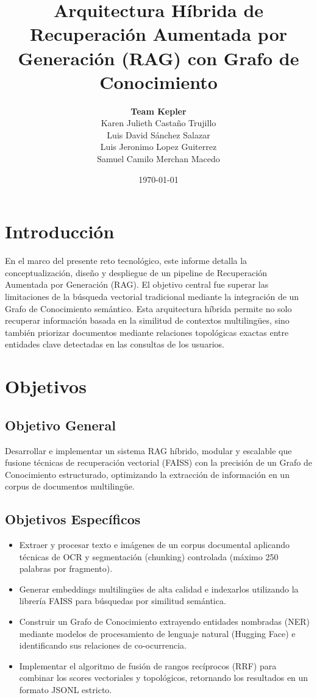 \documentclass[12pt,a4paper]{article}
\title{\textbf{Arquitectura Híbrida de Recuperación Aumentada por Generación (RAG) con Grafo de Conocimiento}}
\author{
    \textbf{Team Kepler} \\
    Karen Julieth Castaño Trujillo \\
    Luis David Sánchez Salazar \\
    Luis Jeronimo Lopez Guiterrez \\
    Samuel Camilo Merchan Macedo
}
\date{\today}
\begin{document}
\maketitle

\tableofcontents
\newpage

\section{Introducción}
En el marco del presente reto tecnológico, este informe detalla la conceptualización, diseño y despliegue de un pipeline de Recuperación Aumentada por Generación (RAG). El objetivo central fue superar las limitaciones de la búsqueda vectorial tradicional mediante la integración de un Grafo de Conocimiento semántico. Esta arquitectura híbrida permite no solo recuperar información basada en la similitud de contextos multilingües, sino también priorizar documentos mediante relaciones topológicas exactas entre entidades clave detectadas en las consultas de los usuarios.

\section{Objetivos}

\subsection{Objetivo General}
Desarrollar e implementar un sistema RAG híbrido, modular y escalable que fusione técnicas de recuperación vectorial (FAISS) con la precisión de un Grafo de Conocimiento estructurado, optimizando la extracción de información en un corpus de documentos multilingüe.

\subsection{Objetivos Específicos}
\begin{itemize}
    \item Extraer y procesar texto e imágenes de un corpus documental aplicando técnicas de OCR y segmentación (chunking) controlada (máximo 250 palabras por fragmento).
    \item Generar embeddings multilingües de alta calidad e indexarlos utilizando la librería FAISS para búsquedas por similitud semántica.
    \item Construir un Grafo de Conocimiento extrayendo entidades nombradas (NER) mediante modelos de procesamiento de lenguaje natural (Hugging Face) e identificando sus relaciones de co-ocurrencia.
    \item Implementar el algoritmo de fusión de rangos recíprocos (RRF) para combinar los scores vectoriales y topológicos, retornando los resultados en un formato JSONL estricto.
\end{itemize}
\end{document}
